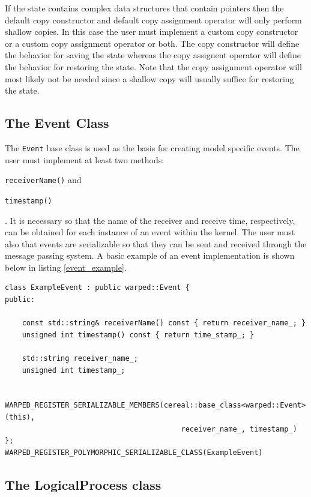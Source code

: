 \documentclass[11pt]{book}
\begin{document}
If the state contains complex data structures that contain pointers then the default copy
constructor and default copy assignment operator will only perform shallow copies. In this
case the user must implement a custom copy constructor or a custom copy assignment operator
or both. The copy constructor will define the behavior for saving the state whereas the
copy assignent operator will define the behavior for restoring the state. Note that the
copy assignment operator will most likely not be needed since a shallow copy will usually
suffice for restoring the state.

\subsection{The Event Class}

The \texttt{Event} base class is used as the basis for creating model specific events. The user must
implement at least two methods: \begin{inparaenum}[(1)] \item \texttt{receiverName()} and 
\item \texttt{timestamp()} \end{inparaenum}. It is necessary so that the name of the receiver
and receive time, respectively, can be obtained for each instance of an event within the kernel.
The user must also that events are serializable so that they can be sent and received through
the message passing system. A basic example of an event implementation is shown below in listing
\ref{event_example}.

\begin{lstlisting}[caption=Example \textsc{warped2} Event Definition, label=event_example, float]
class ExampleEvent : public warped::Event {
public:

    const std::string& receiverName() const { return receiver_name_; }
    unsigned int timestamp() const { return time_stamp_; }

    std::string receiver_name_;
    unsigned int timestamp_;

    WARPED_REGISTER_SERIALIZABLE_MEMBERS(cereal::base_class<warped::Event>(this),
                                         receiver_name_, timestamp_)
};
WARPED_REGISTER_POLYMORPHIC_SERIALIZABLE_CLASS(ExampleEvent)
\end{lstlisting}

\subsection{The LogicalProcess class}
\end{document}
